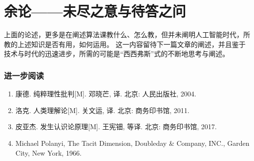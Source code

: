 \section{余论——未尽之意与待答之问}

上面的论述，更多是在阐述算法课教什么、怎么教，但并未阐明人工智能时代，所教的上述知识是否有用，如何运用。
这一内容留待下一篇文章的阐述，并且鉴于技术与时代的迅速进步，所需的可能是“西西弗斯”式的不断地思考与阐述。

\subsubsection{进一步阅读}

\begin{enumerate}
    \item 康德. 纯粹理性批判[M]. 邓晓芒, 译. 北京: 人民出版社, 2004.
    \item 洛克. 人类理解论[M]. 关文运, 译. 北京: 商务印书馆, 2011.
    \item 皮亚杰. 发生认识论原理[M]. 王宪钿, 等译. 北京: 商务印书馆, 2017.
    \item Michael Polanyi, The Tacit Dimension, Doubleday \& Company, INC., Garden City, New York, 1966.
\end{enumerate}
